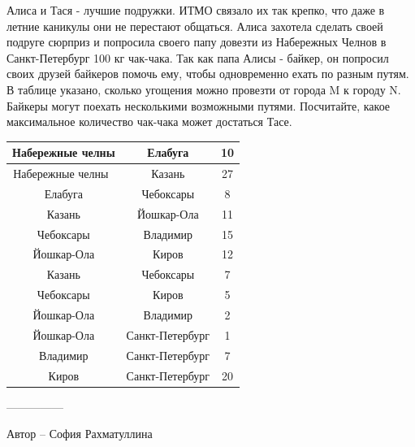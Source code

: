 \question
Алиса и Тася - лучшие подружки. ИТМО связало их так крепко, что даже в летние каникулы они не перестают общаться. Алиса захотела сделать своей подруге сюрприз и попросила своего папу довезти из Набережных Челнов в Санкт-Петербург 100 кг чак-чака. Так как папа Алисы - байкер, он попросил своих друзей байкеров помочь ему, чтобы одновременно ехать по разным путям. В таблице указано, сколько угощения можно провезти от города M к городу N. Байкеры могут поехать несколькими возможными путями. Посчитайте, какое максимальное количество чак-чака может достаться Тасе.

\begin{center}
\begin{tabular}{| c | c | c |}
\hline
Набережные челны & Елабуга & 10\\
\hline
Набережные челны  & Казань & 27\\
\hline
Елабуга & Чебоксары & 8\\
\hline
Казань & Йошкар-Ола & 11\\
\hline
Чебоксары & Владимир & 15\\
\hline
Йошкар-Ола & Киров & 12\\
\hline
Казань& Чебоксары & 7\\
\hline
Чебоксары & Киров & 5\\
\hline
 Йошкар-Ола & Владимир &2\\\hline
 Йошкар-Ола & Санкт-Петербург &1\\\hline
 Владимир & Санкт-Петербург &7\\\hline
 Киров & Санкт-Петербург &20\\\hline

\end{tabular}
\end{center}

---------------

Автор -- София Рахматуллина